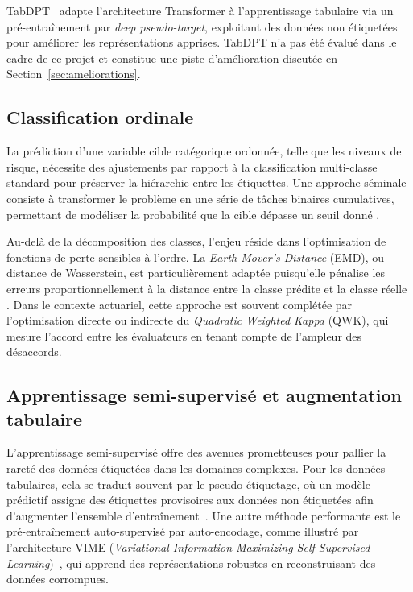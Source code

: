 \documentclass[conference]{IEEEtran}
\begin{document}
TabDPT~\cite{tabdpt2024} adapte l'architecture Transformer à l'apprentissage tabulaire via un pré-entraînement par \emph{deep pseudo-target}, exploitant des données non étiquetées pour améliorer les représentations apprises. TabDPT n'a pas été évalué dans le cadre de ce projet et constitue une piste d'amélioration discutée en Section~\ref{sec:ameliorations}.

\subsection{Classification ordinale}

La prédiction d'une variable cible catégorique ordonnée, telle que les niveaux de risque, nécessite des ajustements par rapport à la classification multi-classe standard pour préserver la hiérarchie entre les étiquettes. Une approche séminale consiste à transformer le problème en une série de tâches binaires cumulatives, permettant de modéliser la probabilité que la cible dépasse un seuil donné \cite{frank2001simple}.

Au-delà de la décomposition des classes, l'enjeu réside dans l'optimisation de fonctions de perte sensibles à l'ordre. La \textit{Earth Mover's Distance} (EMD), ou distance de Wasserstein, est particulièrement adaptée puisqu'elle pénalise les erreurs proportionnellement à la distance entre la classe prédite et la classe réelle \cite{hou2016squared}. Dans le contexte actuariel, cette approche est souvent complétée par l'optimisation directe ou indirecte du \textit{Quadratic Weighted Kappa} (QWK), qui mesure l'accord entre les évaluateurs en tenant compte de l'ampleur des désaccords.


\subsection{Apprentissage semi-supervisé et augmentation tabulaire}

L'apprentissage semi-supervisé offre des avenues prometteuses pour pallier la rareté des données étiquetées dans les domaines complexes. Pour les données tabulaires, cela se traduit souvent par le pseudo-étiquetage, où un modèle prédictif assigne des étiquettes provisoires aux données non étiquetées afin d'augmenter l'ensemble d'entraînement~\cite{lee2013pseudo}. Une autre méthode performante est le pré-entraînement auto-supervisé par auto-encodage, comme illustré par l'architecture VIME (\textit{Variational Information Maximizing Self-Supervised Learning})~\cite{yoon2020vime}, qui apprend des représentations robustes en reconstruisant des données corrompues.
\end{document}
